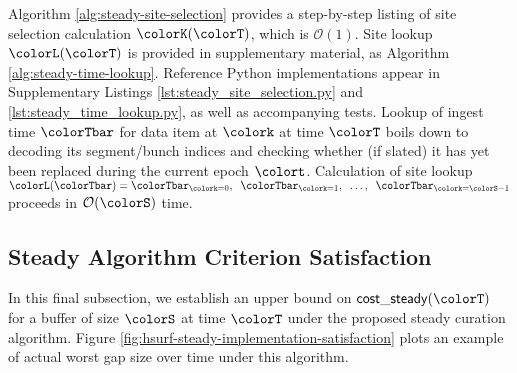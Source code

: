 Algorithm \ref{alg:steady-site-selection} provides a step-by-step listing of site selection calculation $\colorK(\colorT)$, which is $\mathcal{O}(1)$.
Site lookup $\colorL(\colorT)$ is provided in supplementary material, as Algorithm \ref{alg:steady-time-lookup}.
Reference Python implementations appear in Supplementary Listings \ref{lst:steady_site_selection.py} and \ref{lst:steady_time_lookup.py}, as well as accompanying tests.
Lookup of ingest time $\colorTbar$ for data item at $\colork$ at time $\colorT$ boils down to decoding its segment/bunch indices and checking whether (if slated) it has yet been replaced during the current epoch $\colort$.
Calculation of site lookup $\colorL(\colorTbar) = \colorTbar_{\colork=0},\;\; \colorTbar_{\colork=1},\;\; \ldots,\;\; \colorTbar_{\colork=\colorS-1}$ proceeds in $\mathcal{O}(\colorS)$ time.

\subsection{Steady Algorithm Criterion Satisfaction}
\label{sec:stready-satisfaction}

In this final subsection, we establish an upper bound on $\mathsf{cost\_steady}(\colorT)$ for a buffer of size $\colorS$ at time $\colorT$ under the proposed steady curation algorithm.
Figure \ref{fig:hsurf-steady-implementation-satisfaction} plots an example of actual worst gap size over time under this algorithm.


